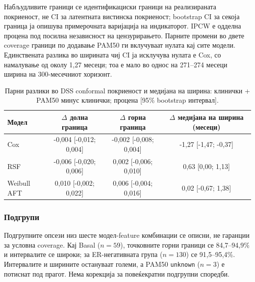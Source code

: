 \documentclass[12pt]{article}
\begin{document}
Набљудливите граници се идентификациски граници на реализираната покриеност,
не CI за латентната вистинска покриеност; bootstrap CI за секоја граница ја
опишува примерочната варијација на индикаторот. IPCW е одделна процена под
посилна независност на цензурирањето. Парните промени во двете coverage граници
по додавање PAM50 ги вклучуваат нулата кај сите модели. Единствената разлика во
ширината чиј CI ја исклучува нулата е Cox, со намалување од околу 1,27 месеци;
тоа е мало во однос на 271--274 месеци ширина на 300-месечниот хоризонт.

\begin{table}[ht]
\centering
\caption{Парни разлики во DSS conformal покриеност и медијана на ширина:
клинички + PAM50 минус клинички; процена [95\% bootstrap интервал].}
\label{tab:dss-pam50-coverage-delta}
\scriptsize
\begin{tabular}{lccc}
\hline
Модел & $\Delta$ долна граница & $\Delta$ горна граница & $\Delta$ медијана на ширина (месеци) \\
\hline
Cox & -0,004 [-0,012; 0,004] & -0,002 [-0,008; 0,004] & -1,27 [-1,47; -0,37] \\
RSF & -0,006 [-0,020; 0,006] & 0,002 [-0,006; 0,010] & 0,63 [0,00; 1,13] \\
Weibull AFT & 0,010 [-0,002; 0,022] & 0,006 [-0,004; 0,016] & 0,02 [-0,67; 1,38] \\
\hline
\end{tabular}
\end{table}
\subsubsection{Подгрупи}

Подгрупните опсези низ шесте модел-feature комбинации се описни, не гаранции за
условна coverage. Кај Basal ($n=59$), точковните горни граници се 84,7--94,9\%
и интервалите се широки; за ER-негативната група ($n=130$) се 91,5--95,4\%.
Интервалите и ширините остануваат големи, а PAM50 \texttt{unknown} ($n=3$) е
потиснат под прагот. Нема корекција за повеќекратни подгрупни споредби.
\end{document}
